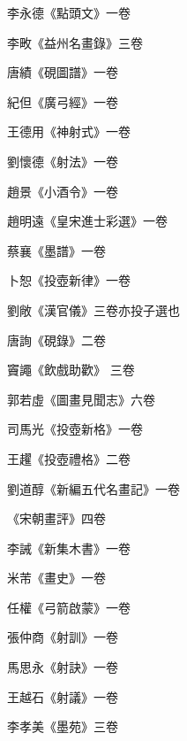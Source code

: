 \begin{pinyinscope}
 李永德《點頭文》一卷



 李畋《益州名畫錄》三卷



 唐績《硯圖譜》一卷



 紀但《廣弓經》一卷



 王德用《神射式》一卷



 劉懷德《射法》一卷



 趙景《小酒令》一卷



 趙明遠《皇宋進士彩選》一卷



 蔡襄《墨譜》一卷



 卜恕《投壺新律》一卷



 劉敞《漢官儀》三卷亦投子選也



 唐詢《硯錄》二卷



 竇譝《飲戲助歡》
 三卷



 郭若虛《圖畫見聞志》六卷



 司馬光《投壺新格》一卷



 王趯《投壺禮格》二卷



 劉道醇《新編五代名畫記》一卷



 《宋朝畫評》四卷



 李誡《新集木書》一卷



 米芾《畫史》一卷



 任權《弓箭啟蒙》一卷



 張仲商《射訓》一卷



 馬思永《射訣》一卷



 王越石《射議》一卷



 李孝美《墨苑》三卷




\end{pinyinscope}
